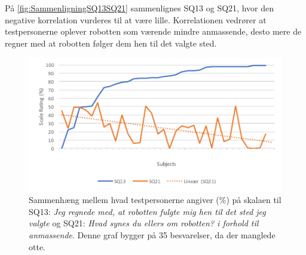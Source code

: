 \noindent
%
På \autoref{fig:SammenligningSQ13SQ21} sammenlignes SQ13 og SQ21, hvor den negative korrelation vurderes til at være lille. Korrelationen vedrører at testpersonerne oplever robotten som værende mindre anmassende, desto mere de regner med at robotten følger dem hen til det valgte sted.
%
\begin{figure}[H]
	\centering
	\includegraphics[width=\textwidth]{Figure/Korrelationsgrafer/SQ13+SQ21}
	\caption{Sammenhæng mellem hvad testpersonerne angiver (\%) på skalaen til SQ13: \textit{Jeg regnede med, at robotten fulgte mig hen til det sted jeg valgte} og SQ21: \textit{Hvad synes du ellers om robotten? i forhold til \textit{anmassende}}. Denne graf bygger på 35 besvarelser, da der manglede otte.}
	\label{fig:SammenligningSQ13SQ21}
\end{figure}
\newpage
\noindent
%